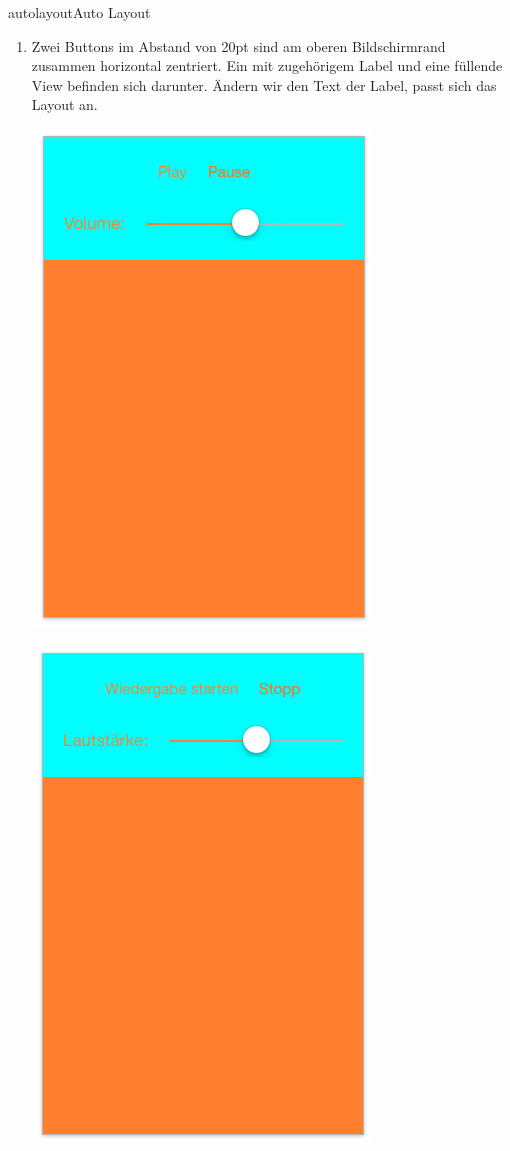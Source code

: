 \documentclass[parskip=half, final]{scrreprt}
\begin{document}
\begin{lecture}
\begin{exc}
\begin{excitem}{autolayout}{Auto Layout}
\begin{enumerate}
\item Zwei Buttons im Abstand von 20pt sind am oberen Bildschirmrand zusammen horizontal zentriert. Ein  mit zugehörigem Label und eine füllende View befinden sich darunter. Ändern wir den Text der Label, passt sich das Layout an.

\begin{minipage}{.5\linewidth}
  \centering
  \includegraphics[width=\linewidth, height=\linewidth, keepaspectratio]{img/al_31.png}
\end{minipage}
\begin{minipage}{.5\linewidth}
  \centering
  \includegraphics[width=\linewidth, height=\linewidth, keepaspectratio]{img/al_32.png}
\end{minipage}


\end{enumerate}
\end{excitem}
\end{exc}
\end{lecture}
\end{document}
